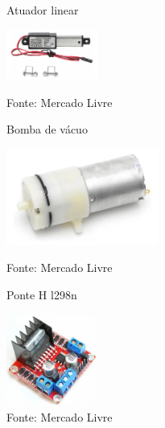 \documentclass[../poliXuniversity_hospital_(USP)_report.tex]{subfiles}
\begin{document}
\begin{figure}[h]
\centering
    \begin{minipage}{0.3\textwidth}
        \centering
        \caption{Atuador linear}
        \centering %
        \includegraphics[width=3cm]{images/atuador_linear.jpg}
        \caption*{Fonte: Mercado Livre}
        \label{figura: Atuador}
        
    \end{minipage}\hfill
    \begin{minipage}{0.3\textwidth}
    
        \centering
        \caption{Bomba de vácuo}
        \centering %
        \includegraphics[width=5cm]{images/bomba.jpg}
        \caption*{Fonte: Mercado Livre}
        \label{figura: Bomba de Vácuo}
        
    \end{minipage}\hfill
    \begin{minipage}{0.3\textwidth}
        \centering
        \caption{Ponte H l298n}
        \centering %
        \includegraphics[width=3cm]{images/l298n.jpg}
        \caption*{Fonte: Mercado Livre}
        \label{figura: l298n}
        
    \end{minipage}\hfill
\end{figure}
\end{document}
